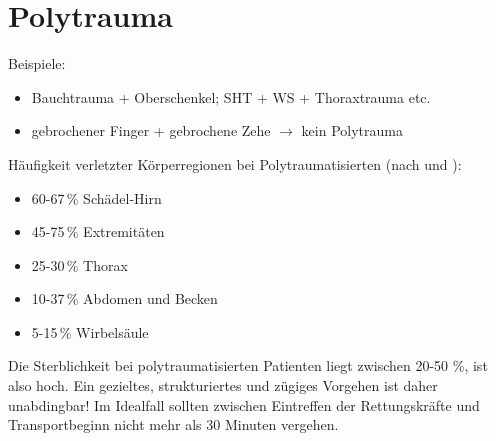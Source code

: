 
\section{Polytrauma}
\label{topic:polytrauma}



Beispiele:
\begin{itemize}
  \item Bauchtrauma + Oberschenkel; SHT + WS + Thoraxtrauma etc.
  \item gebrochener Finger + gebrochene Zehe ${\rightarrow}$ kein
  Polytrauma
\end{itemize}

Häufigkeit verletzter Körperregionen bei Polytraumatisierten (nach
\cite{BoehmerTaschRett6} und \cite{Gorgass7}):
\begin{itemize}
  \item 60-67\,\% Schädel-Hirn
  \item 45-75\,\% Extremitäten
  \item 25-30\,\% Thorax
  \item 10-37\,\% Abdomen und Becken
  \item 5-15\,\% Wirbelsäule
\end{itemize}


Die Sterblichkeit bei polytraumatisierten Patienten liegt zwischen 20-50 \%, ist
also hoch. Ein gezieltes, strukturiertes und zügiges Vorgehen ist daher
unabdingbar! Im Idealfall sollten zwischen Eintreffen der Rettungskräfte und
Transportbeginn nicht mehr als 30 Minuten vergehen. \cite{BoehmerTaschRett6}

